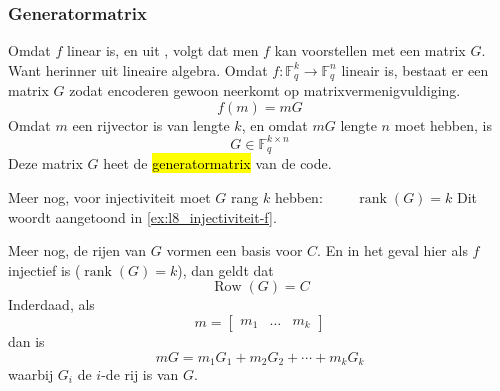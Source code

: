 \subsubsection{Generatormatrix}

Omdat $f$ linear is, en uit , volgt dat men $f$ kan voorstellen met een matrix $G$. Want herinner uit lineaire algebra. Omdat $f: \mathbb{F}_q^k \to \mathbb{F}_q^n$ lineair is, bestaat er een matrix $G$ zodat encoderen gewoon neerkomt op matrixvermenigvuldiging.
\begin{equation*}
    f(m) = mG
\end{equation*}
Omdat $m$ een rijvector is van lengte $k$, en omdat $mG$ lengte $n$ moet hebben, is
\begin{equation*}
    G \in \mathbb{F}_q^{k \times n}
\end{equation*}
Deze matrix $G$ heet de \hl{generatormatrix} van de code.

Meer nog, voor injectiviteit moet $G$ rang $k$ hebben: $\qquad \operatorname{rank}(G) = k$ \newline
Dit woordt aangetoond in \cref{ex:l8_injectiviteit-f}.

Meer nog, de rijen van $G$ vormen een basis voor $C$. En in het geval hier als $f$ injectief is ($\operatorname{rank}(G)=k$), dan geldt dat
\begin{equation*}
    \operatorname{Row}(G) = C
\end{equation*}
Inderdaad, als
\begin{equation*}
    m = \begin{bmatrix}
        m_1 & \dots & m_k
    \end{bmatrix}
\end{equation*}
dan is
\begin{equation*}
    mG = m_1G_1 + m_2G_2 + \cdots + m_kG_k
\end{equation*}
waarbij $G_i$ de $i$-de rij is van $G$.

